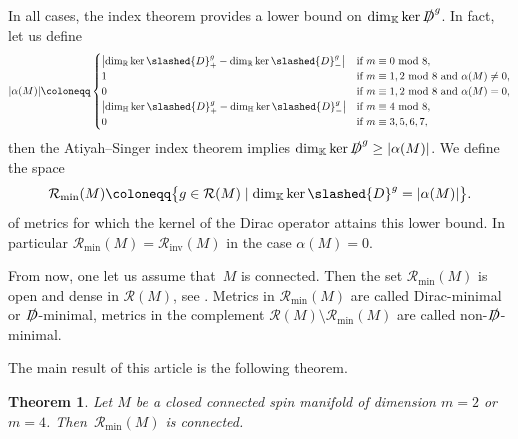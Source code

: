 \documentclass[11pt]{article}
\numberwithin{equation}{section}
\newcommand\ceq{\coloneqq}
\newcommand\Dirac{\slashed{D}} %
\newcommand\Dminimal{$\Dirac$-minimal}
\newcommand\<{\langle}
\renewcommand\>{\rangle}
\newcommand{\HH}{\mathbb{H}}
\newcommand{\KK}{\mathbb K}
\newcommand{\RR}{\mathbb R}
\newcommand{\mod}{\,\,\mathrm{mod}\,\,}
\newcommand{\maR}{\mathcal R}
\newtheorem{Theorem}{Theorem}[section]
\theoremstyle{definition}
\newcommand\={\,=\,}
\newcommand\Rmin{\maR_{\mathrm{min}}}
\newcommand\Rinv{\maR_{\mathrm{inv}}}
\numberwithin{equation}{section}
\begin{document}
In all cases, the index theorem provides a lower bound on $\dim_\KK\ker\Dirac^g$.
In fact, let us define
\[|\alpha(M)|\ceq
 \begin{cases}
 \bigl|\dim_\RR \ker\Dirac^g_+ -\dim_\RR \ker\Dirac^g_-\bigr| & \text{if}\ m\equiv0 \mod 8,\\
 1 & \text{if}\ m\equiv 1,2\mod 8 \ \text{and}\ \alpha(M)\neq 0,\\
 0 & \text{if}\ m\equiv 1,2\mod 8 \ \text{and}\ \alpha(M)= 0,\\
 \bigl|\dim_\HH \ker\Dirac^g_+ -\dim_\HH \ker\Dirac^g_-\bigr| & \text{if}\ m\equiv 4\mod 8,\\
 0 & \text{if}\ m\equiv 3,5,6,7,
 \end{cases}
\]
then the Atiyah--Singer index theorem implies $\dim_\KK\ker\Dirac^g\geq|\alpha(M)|$.
We define the space
\[
\Rmin(M) \ceq
\bigl\{g\in \maR(M) \mid \dim_\KK \ker \Dirac^{g}=|\alpha(M)| \bigr\}.
\]
of metrics for which the kernel of the Dirac operator attains this lower bound. In particular $\Rmin(M)=\Rinv(M)$ in the case $\alpha(M)=0$.

From now, one let us assume that~$M$ is connected. Then the set $\Rmin(M)$ is open and dense in $\maR(M)$, see \cite{ammann.dahl.humbert:09}. Metrics in $\Rmin(M)$ are called Dirac-minimal or \Dminimal{}, metrics in the complement $\maR(M) \setminus \Rmin(M)$ are called non-\Dminimal.

The main result of this article is the following theorem.
\begin{Theorem}\label{thm.main}
Let $M$ be a closed connected spin manifold of dimension $m=2$ or $m=4$. Then~$\Rmin(M)$ is connected.
\end{Theorem}
\end{document}
